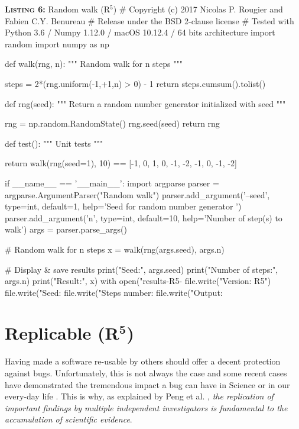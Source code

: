 \documentclass[a4paper,11pt]{article}
\begin{document}
\begin{code}{\textbf{\textsc{Listing 6:}} Random walk (R$^5$)}
# Copyright (c) 2017 Nicolas P. Rougier and Fabien C.Y. Benureau
# Release under the BSD 2-clause license
# Tested with Python 3.6 / Numpy 1.12.0 / macOS 10.12.4 / 64 bits architecture
import random
import numpy as np

def walk(rng, n):
    """ Random walk for n steps """

    steps = 2*(rng.uniform(-1,+1,n) > 0) - 1
    return steps.cumsum().tolist()

def rng(seed):
    """ Return a random number generator initialized with seed """ 
    
    rng = np.random.RandomState()
    rng.seed(seed)
    return rng

def test():
    """ Unit tests """

    return walk(rng(seed=1), 10) == [-1, 0, 1, 0, -1, -2, -1, 0, -1, -2]

if __name__ == '__main__':
    import argparse
    parser = argparse.ArgumentParser("Random walk")
    parser.add_argument('--seed', type=int, default=1,
                        help='Seed for random number generator ')
    parser.add_argument('n', type=int, default=10,
                        help='Number of step(s) to walk')
    args = parser.parse_args()

    # Random walk for n steps
    x = walk(rng(args.seed), args.n)

    # Display & save results
    print("Seed:", args.seed)
    print("Number of steps:", args.n)
    print("Result:",  x)
    with open("results-R5-%
        file.write("Version: R5")
        file.write("Seed: %
        file.write("Steps number: %
        file.write("Output: %
\end{code}


\clearpage
\section*{Replicable (R$^{\mathbf 5}$)}

Having made a software re-usable by others should offer a decent protection against bugs. Unfortunately, this is not always the case and some recent cases have demonstrated the tremendous impact a bug can have in Science \citep{Eklund:2016} or in our every-day life \citep{Durumeric:2014}.
This is why, as explained by Peng et al. \cite{Peng:2006}, {\em the replication of important findings by multiple independent investigators is fundamental to the accumulation of scientific evidence}.
\end{document}
